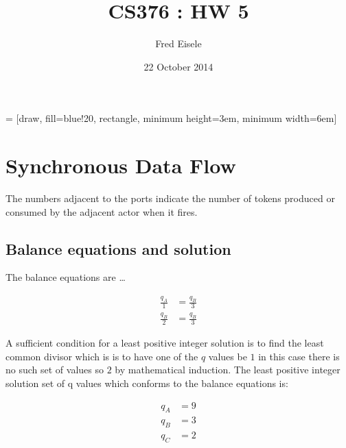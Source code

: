 \documentclass{article}
\title{CS376 : HW 5}
\author{Fred Eisele }
\date{22 October 2014}
\begin{document}
\renewcommand{\thesection}{\arabic{section}}
\renewcommand{\thesubsection}{\alph{subsection}}

\maketitle

 = [draw, fill=blue!20, rectangle,
    minimum height=3em, minimum width=6em]

\setcounter{section}{5}

\section{Synchronous Data Flow}


The numbers adjacent to the ports indicate the number of tokens
produced or consumed by the adjacent actor when it fires.

\subsection{Balance equations and solution}

The balance equations are \ldots

\begin{align}
\frac{q_A}{1} & = \frac{q_B}{3} \\
\frac{q_B}{2} & = \frac{q_B}{3}
\end{align}

A sufficient condition for a least positive integer solution
is to find the least common divisor which is
is to have one of the $q$ values be $1$ in this case there
is no such set of values so $2$ by mathematical induction.
The least positive integer solution set of q values
which conforms to the balance equations is:

\begin{align}
q_A & = 9  \\
q_B & = 3 \\
q_C & = 2
\end{align}
\end{document}
